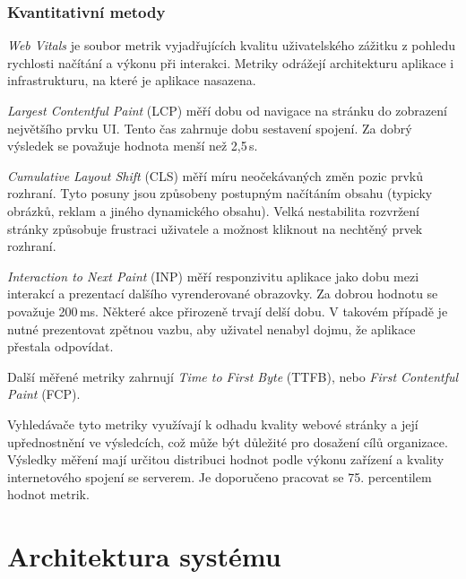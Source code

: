 
\subsubsection{Kvantitativní metody}
\label{kvantMethods}


\emph{Web Vitals} je soubor metrik vyjadřujících kvalitu uživatelského zážitku z pohledu rychlosti načítání a výkonu při interakci.
Metriky odrážejí architekturu aplikace i infrastrukturu, na které je aplikace nasazena.

\emph{Largest Contentful Paint} (LCP) měří dobu od navigace na stránku do zobrazení největšího prvku UI.
Tento čas zahrnuje dobu sestavení spojení.
Za dobrý výsledek se považuje hodnota menší než 2,5\,s.

\emph{Cumulative Layout Shift} (CLS) měří míru neočekávaných změn pozic prvků rozhraní.
Tyto posuny jsou způsobeny postupným načítáním obsahu (typicky obrázků, reklam a jiného dynamického obsahu).
Velká nestabilita rozvržení stránky způsobuje frustraci uživatele a možnost kliknout na nechtěný prvek rozhraní.

\emph{Interaction to Next Paint} (INP) měří responzivitu aplikace jako dobu mezi interakcí a prezentací dalšího vyrenderované obrazovky.
Za dobrou hodnotu se považuje 200\,ms.
Některé akce přirozeně trvají delší dobu.
V takovém případě je nutné prezentovat zpětnou vazbu, aby uživatel nenabyl dojmu, že aplikace přestala odpovídat. 

Další měřené metriky zahrnují \emph{Time to First Byte} (TTFB), nebo \emph{First Contentful Paint} (FCP).

Vyhledávače tyto metriky využívají k odhadu kvality webové stránky a její upřednostnění ve výsledcích, což může být důležité pro dosažení cílů organizace.
Výsledky měření mají určitou distribuci hodnot podle výkonu zařízení a kvality internetového spojení se serverem.
Je doporučeno pracovat se 75. percentilem hodnot metrik.

\cite{coreWebVitals}


\section{Architektura systému}

